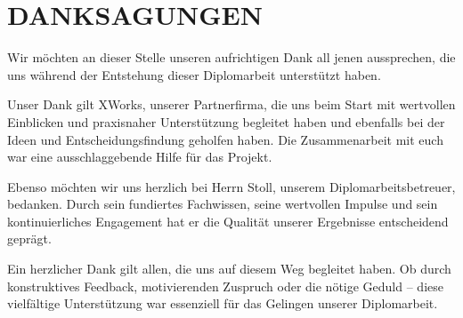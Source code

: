 \chapter{DANKSAGUNGEN}
\thispagestyle{nurSeitenzahl}
Wir möchten an dieser Stelle unseren aufrichtigen Dank all jenen aussprechen, die uns während der Entstehung dieser Diplomarbeit unterstützt haben.

Unser Dank gilt XWorks, unserer Partnerfirma, die uns beim Start mit wertvollen Einblicken und praxisnaher Unterstützung begleitet haben und ebenfalls bei der Ideen und Entscheidungsfindung geholfen haben. Die Zusammenarbeit mit euch war eine ausschlaggebende Hilfe für das Projekt.

Ebenso möchten wir uns herzlich bei Herrn Stoll, unserem Diplomarbeitsbetreuer, bedanken. Durch sein fundiertes Fachwissen, seine wertvollen Impulse und sein kontinuierliches Engagement hat er die Qualität unserer Ergebnisse entscheidend geprägt.

Ein herzlicher Dank gilt allen, die uns auf diesem Weg begleitet haben. Ob durch konstruktives Feedback, motivierenden Zuspruch oder die nötige Geduld – diese vielfältige Unterstützung war essenziell für das Gelingen unserer Diplomarbeit.
\newpage